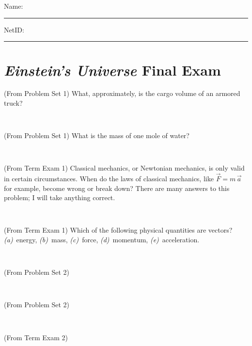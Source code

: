 \documentclass[12pt, letterpaper]{article}
\begin{document}
\noindent
Name: \rule[-1ex]{0.60\textwidth}{0.1pt}
NetID: \rule[-1ex]{0.20\textwidth}{0.1pt}

\section*{\textsl{Einstein's Universe} Final Exam}
\setcounter{problem}{1}

\begin{problem}
  (From Problem Set 1)
  What, approximately, is the cargo volume of an armored truck?
\end{problem}

\vfill ~

\begin{problem}
  (From Problem Set 1)
  What is the mass of one mole of water?
\end{problem}

\vfill ~

\begin{problem}
  (From Term Exam 1)
  Classical mechanics, or Newtonian mechanics, is only valid in certain
circumstances. When do the laws of classical mechanics, like $\vec{F} =
m\,\vec{a}$ for example, become wrong or break down? There are many answers
to this problem; I will take anything correct.
\end{problem}

\vfill ~

\begin{problem}
  (From Term Exam 1)
  Which of the following physical quantities are vectors?
\\
\textsl{(a)}~energy,
\textsl{(b)}~mass,
\textsl{(c)}~force,
\textsl{(d)}~momentum,
\textsl{(e)}~acceleration.
\end{problem}

\vfill ~

\clearpage

\begin{problem}
(From Problem Set 2)
\end{problem}

\vfill ~

\begin{problem}
(From Problem Set 2)
\end{problem}

\vfill ~

\begin{problem}
(From Term Exam 2)
\end{problem}

\vfill ~
\end{document}
